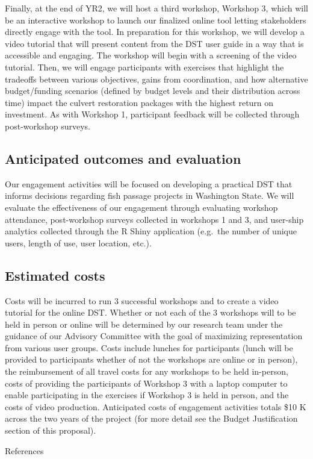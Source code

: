 \documentclass[12pt]{elsarticle}
\begin{document}
Finally, at the end of YR2, we will host a third workshop, Workshop 3, which will be an interactive workshop to launch our finalized online tool letting stakeholders directly engage with the tool. In preparation for this workshop, we will develop a video tutorial that will present content from the DST user guide in a way that is accessible and engaging. The workshop will begin with a screening of the video tutorial. Then, we will engage participants with exercises that highlight the tradeoffs between various objectives, gains from coordination, and how alternative budget/funding scenarios (defined by budget levels and their distribution across time) impact the culvert restoration packages with the highest return on investment. As with Workshop 1, participant feedback will be collected through post-workshop surveys.

\subsection*{Anticipated outcomes and evaluation}

Our engagement activities will be focused on developing a practical DST that informs decisions regarding fish passage projects in Washington State. We will evaluate the effectiveness of our engagement through evaluating workshop attendance, post-workshop surveys collected in workshops 1 and 3, and user-ship analytics collected through the R Shiny application (e.g.\ the number of unique users, length of use, user location, etc.).

\subsection*{Estimated costs}

Costs will be incurred to run 3 successful workshops and to create a video tutorial for the online DST. Whether or not each of the 3 workshops will to be held in person or online will be determined by our research team under the guidance of our Advisory Committee with the goal of maximizing representation from various user groups. Costs include lunches for participants (lunch will be provided to participants whether of not the workshops are online or in person), the reimbursement of all travel costs for any workshops to be held in-person, costs of providing the participants of Workshop 3 with a laptop computer to enable participating in the exercises if Workshop 3 is held in person, and the costs of video production. Anticipated costs of engagement activities totals \$10 K across the two years of the project (for more detail see the Budget Justification section of this proposal).

\clearpage
\large References\\
\normalsize

\end{document}
